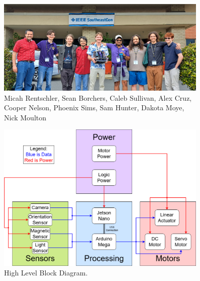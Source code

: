 \documentclass[final]{beamer}
\newlength{\sepwidth}
\newlength{\colwidth}
\newcommand{\separatorcolumn}{\begin{column}{\sepwidth}\end{column}}
\begin{document}
\begin{frame}[t]
\begin{columns}[t]
\begin{column}{\colwidth}
    

\end{column}

\separatorcolumn

\begin{column}{\colwidth}

    \begin{figure}
      \centering
      \includegraphics[width=30.0cm]{Team Picture SECON 2025.jpg}
      \caption{Micah Rentschler, Sean Borchers, Caleb Sullivan, Alex Cruz, Cooper Nelson, Phoenix Sims, Sam Hunter, Dakota Moye, Nick Moulton}
    \end{figure}

    \begin{figure}
      \centering
      \includegraphics[width=20.0cm]{High_Block_Diagram.png}
      \caption{High Level Block Diagram.}
    \end{figure}


\end{column}
\end{columns}
\end{frame}
\end{document}
